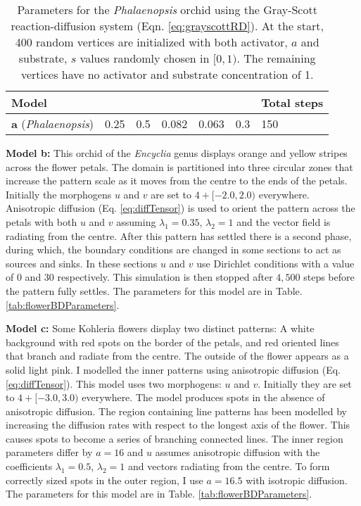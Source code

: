 \begin{table}[ht]
	\centering
	\begin{tabular}{lllllll}
	\hline
	\textbf{Model} & \bm{$D_a$} &\bm{$D_s$} &\bm{$F$} &\bm{$k$} &\bm{$dt$} & \textbf{Total steps} \\ \hline 
	\textbf{a} (\textit{Phalaenopsis})& 0.25& 0.5 &0.082 &0.063 &0.3 &150                \\ \hline
	\end{tabular}
	\caption {Parameters for the \textit{Phalaenopsis} orchid using the Gray-Scott reaction-diffusion system (Eqn. \ref{eq:grayscottRD}). At the start, 400 random vertices are initialized with both activator, $a$ and substrate, $s$ values randomly chosen in $[0, 1)$. The remaining vertices have no activator and substrate concentration of 1.}
	\label{tab:flowerAParameters}
\end{table}

\textbf{Model b:}
This orchid of the \textit{Encyclia} genus displays orange and yellow stripes across the flower petals. The domain is partitioned into three circular zones that increase the pattern scale as it moves from the centre to the ends of the petals. Initially the morphogens $u$ and $v$ are set to $4 + [-2.0, 2.0)$ everywhere. Anisotropic diffusion (Eq. \ref{eq:diffTensor}) is used to orient the pattern across the petals with both $u$ and $v$ assuming $\lambda_1=0.35$, $\lambda_2=1$ and the vector field is radiating from the centre. After this pattern has settled there is a second phase, during which, the boundary conditions are changed in some sections to act as sources and sinks. In these sections $u$ and $v$ use Dirichlet conditions with a value of $0$ and $30$ respectively. This simulation is then stopped after $4,500$ steps before the pattern fully settles. The parameters for this model are in Table. \ref{tab:flowerBDParameters}.

\textbf{Model c:}
Some Kohleria flowers display two distinct patterns: A white background with red spots on the border of the petals, and red oriented lines that branch and radiate from the centre. The outside of the flower appears as a solid light pink. I modelled the inner patterns using anisotropic diffusion (Eq. \ref{eq:diffTensor}). This model uses two morphogens: $u$ and $v$. Initially they are set to $4 + [-3.0, 3.0)$ everywhere. The model produces spots in the absence of anisotropic diffusion. The region containing line patterns has been modelled by increasing the diffusion rates with respect to the longest axis of the flower. This causes spots to become a series of branching connected lines. The inner region parameters differ by $a=16$ and $u$  assumes anisotropic diffusion with the coefficients $\lambda_{1}=0.5$, $\lambda_{2}=1$ and vectors radiating from the centre. To form correctly sized spots in the outer region, I use $a=16.5$ with isotropic diffusion. The parameters for this model are in Table. \ref{tab:flowerBDParameters}.

